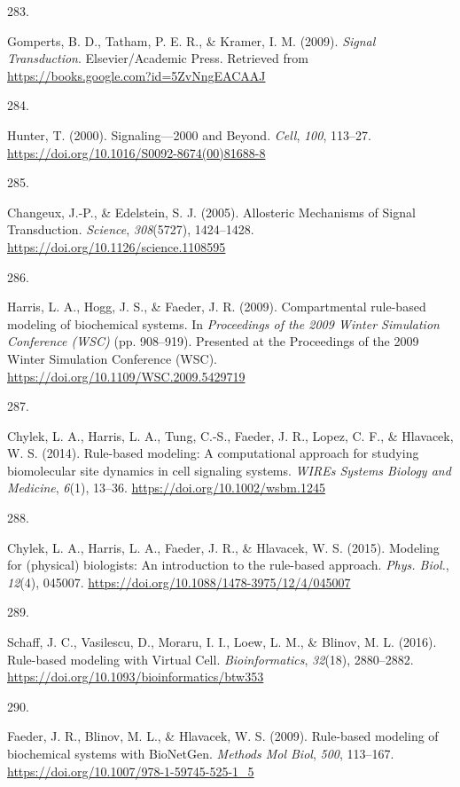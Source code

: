 \documentclass[
  11pt,
  letterpaper,
]{scrreprt}
\newlength{\cslhangindent}
\newlength{\csllabelwidth}
\newenvironment{CSLReferences}[2] %
 {\begin{list}{}{%
  \setlength{\itemindent}{0pt}
  \setlength{\leftmargin}{0pt}
  \setlength{\parsep}{0pt}
  \ifodd #1
   \setlength{\leftmargin}{\cslhangindent}
   \setlength{\itemindent}{-1\cslhangindent}
  \fi
  \setlength{\itemsep}{#2\baselineskip}}}
 {\end{list}}
\newcommand{\CSLLeftMargin}[1]{\parbox[t]{\csllabelwidth}{\strut#1\strut}}
\newcommand{\CSLRightInline}[1]{\parbox[t]{\linewidth - \csllabelwidth}{\strut#1\strut}}
\begin{document}
\begin{CSLReferences}{0}{0}
\CSLLeftMargin{283. }%
\CSLRightInline{Gomperts, B. D., Tatham, P. E. R., \& Kramer, I. M.
(2009). \emph{Signal {Transduction}}. Elsevier/Academic Press. Retrieved
from \url{https://books.google.com?id=5ZvNngEACAAJ}}

\CSLLeftMargin{284. }%
\CSLRightInline{Hunter, T. (2000). Signaling---2000 and {Beyond}.
\emph{Cell}, \emph{100}, 113--27.
\url{https://doi.org/10.1016/S0092-8674(00)81688-8}}

\CSLLeftMargin{285. }%
\CSLRightInline{Changeux, J.-P., \& Edelstein, S. J. (2005). Allosteric
{Mechanisms} of {Signal Transduction}. \emph{Science}, \emph{308}(5727),
1424--1428. \url{https://doi.org/10.1126/science.1108595}}

\CSLLeftMargin{286. }%
\CSLRightInline{Harris, L. A., Hogg, J. S., \& Faeder, J. R. (2009).
Compartmental rule-based modeling of biochemical systems. In
\emph{Proceedings of the 2009 {Winter Simulation Conference} ({WSC})}
(pp. 908--919). Presented at the Proceedings of the 2009 {Winter
Simulation Conference} ({WSC}).
\url{https://doi.org/10.1109/WSC.2009.5429719}}

\CSLLeftMargin{287. }%
\CSLRightInline{Chylek, L. A., Harris, L. A., Tung, C.-S., Faeder, J.
R., Lopez, C. F., \& Hlavacek, W. S. (2014). Rule-based modeling: A
computational approach for studying biomolecular site dynamics in cell
signaling systems. \emph{WIREs Systems Biology and Medicine},
\emph{6}(1), 13--36. \url{https://doi.org/10.1002/wsbm.1245}}

\CSLLeftMargin{288. }%
\CSLRightInline{Chylek, L. A., Harris, L. A., Faeder, J. R., \&
Hlavacek, W. S. (2015). Modeling for (physical) biologists: An
introduction to the rule-based approach. \emph{Phys. Biol.},
\emph{12}(4), 045007.
\url{https://doi.org/10.1088/1478-3975/12/4/045007}}

\CSLLeftMargin{289. }%
\CSLRightInline{Schaff, J. C., Vasilescu, D., Moraru, I. I., Loew, L.
M., \& Blinov, M. L. (2016). Rule-based modeling with {Virtual Cell}.
\emph{Bioinformatics}, \emph{32}(18), 2880--2882.
\url{https://doi.org/10.1093/bioinformatics/btw353}}

\CSLLeftMargin{290. }%
\CSLRightInline{Faeder, J. R., Blinov, M. L., \& Hlavacek, W. S. (2009).
Rule-based modeling of biochemical systems with {BioNetGen}.
\emph{Methods Mol Biol}, \emph{500}, 113--167.
\url{https://doi.org/10.1007/978-1-59745-525-1_5}}


\end{CSLReferences}
\end{document}
